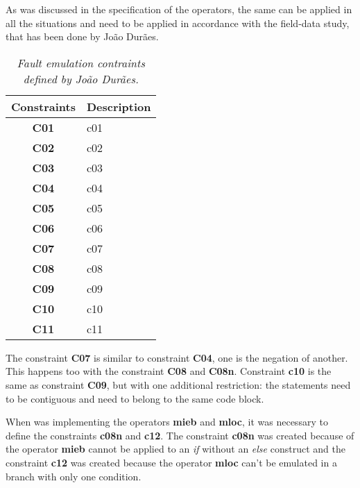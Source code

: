 As was discussed in the specification of the operators, the same can be applied in all the situations and need to be applied in accordance with the field-data study, that has been done by João Durães.

\begin{table}[!ht]
\centering
\begin{tabular}{|c|p{12cm}|}
\hline
\textbf{Constraints}            & \multicolumn{1}{c|}{\textbf{Description}}                                     \\ \hline \hline
\textbf{C01}         			& \Acl{c01} \\ \hline
\textbf{C02}         			& \Acl{c02} \\ \hline
\textbf{C03}         			& \Acl{c03} \\ \hline
\textbf{C04}         			& \Acl{c04} \\ \hline
\textbf{C05}         			& \Acl{c05} \\ \hline
\textbf{C06}         			& \Acl{c06} \\ \hline
\textbf{C07}         			& \Acl{c07} \\ \hline
\textbf{C08}         			& \Acl{c08} \\ \hline
\textbf{C09}         			& \Acl{c09} \\ \hline
\textbf{C10}         			& \Acl{c10} \\ \hline
\textbf{C11}         			& \Acl{c11} \\ \hline
\end{tabular}
\caption{\small \sl Fault emulation contraints defined by João Durães.\label{tab:faultEmulationConstraintsDuraes}}
\end{table}

The constraint \textbf{C07} is similar to constraint \textbf{C04}, one is the negation of another. This happens too with the constraint \textbf{C08} and \textbf{C08n}.
Constraint \textbf{c10} is the same as constraint \textbf{C09}, but with one additional restriction: the statements need to be contiguous and need to belong to the same code block.

When was implementing the operators \textbf{\ac{mieb}} and \textbf{\ac{mloc}}, it was necessary to define the constraints \textbf{\ac{c08n}} and \textbf{\ac{c12}}. The constraint \textbf{\ac{c08n}} was created because of the operator \textbf{\ac{mieb}} cannot be applied to an \textit{if} without an \textit{else} construct and the constraint \textbf{\ac{c12}} was created because the operator \textbf{\ac{mloc}} can't be emulated in a branch with only one condition.


